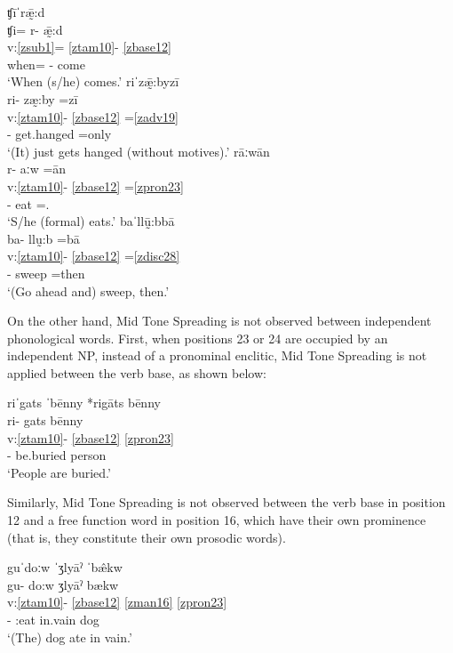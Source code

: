\documentclass[output=paper]{langscibook}
\begin{document}
\ea\label{bkm:Ref82611309}
{ʧīˈrǣ̰:d}\\
\glll ʧi= r- ǣ̰:d\\
v:\ref{zsub1}= \ref{ztam10}- \ref{zbase12}\\
when= \Hab{}- come\\
\glt `When (s/he) comes.'
\ex\label{bkm:Ref82611487}\label{bkm:Ref82611445}
{riˈzǣ̰:byzī}\\
\glll ri- zæ̰:by =zī\\
v:\ref{ztam10}- \ref{zbase12} =\ref{zadv19}\\
\Hab{}- get.hanged =only\\
\glt  `(It) just gets hanged (without motives).'
\ex\label{ex:key:zap:79}
{rāːwān}\\
\glll r- aːw =ān\\
v:\ref{ztam10}- \ref{zbase12} =\ref{zpron23}\\
\Hab{}- eat =\Third\Sg.\For{}\\
\glt `S/he (formal) eats.'
\ex\label{ex:key:zap:80}
{baˈllṵ̄:bbā}\\
\glll ba- llṵ:b =bā\\
v:\ref{ztam10}- \ref{zbase12} =\ref{zdisc28} \\
\Imp{}- sweep =then\\
\glt `(Go ahead and) sweep, then.'
\z

On the other hand, Mid Tone Spreading is not observed between independent phonological words. First, when positions 23 or 24 are occupied by an independent NP, instead of a pronominal enclitic, Mid Tone Spreading is not applied between the verb base, as shown below:

\ea\label{ex:key:zap:81}
{riˈgats ˈbēnny      \hspace{3cm}      *rigāts bēnny}\\
\glll ri- gats bēnny\\
v:\ref{ztam10}- \ref{zbase12}  \ref{zpron23} \\
\Hab{}- be.buried person\\
\glt `People are buried.'
\z

Similarly, Mid Tone Spreading is not observed between the verb base in position 12 and a free function word in position 16, which have their own prominence (that is, they constitute their own prosodic words).

\newpage
\ea\label{ex:key:zap:82}
{guˈdoːw ˈʒlyāˀ ˈb\^{æ}kw}\\
\glll gu- do:w ʒlyāˀ bækw\\
v:\ref{ztam10}- \ref{zbase12} \ref{zman16} \ref{zpron23} \\
\Compl{}- \Compl{}:eat in.vain dog \\
\glt `(The) dog ate in vain.'
\z
\end{document}
